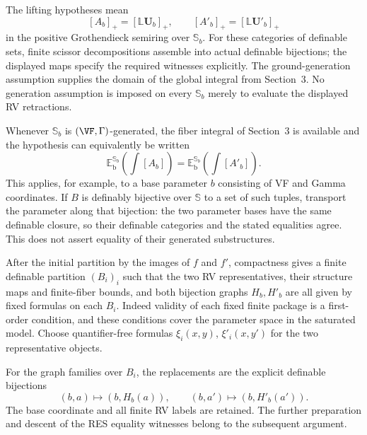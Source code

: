 The lifting hypotheses mean
\[
 [A_b]_+=[\mathbb L\bm U_b]_+,\qquad
 [A'_b]_+=[\mathbb L\bm U'_b]_+
\]
in the positive Grothendieck semiring over $\mathbb S_b$.
For these categories of definable sets, finite scissor
decompositions assemble into actual definable bijections;
the displayed maps specify the required witnesses explicitly.
The ground-generation assumption supplies the domain of
the global integral from Section~3.
No generation assumption is imposed on every $\mathbb S_b$
merely to evaluate the displayed RV retractions.



Whenever $\mathbb S_b$ is $(\VF,\Gamma)$-generated, the fiber
integral of Section~3 is available and the hypothesis can
equivalently be written
\[
 \mathbb E_{\mathrm b}^{\mathbb S_b}
       \!\left(\int[A_b]\right)
 =
 \mathbb E_{\mathrm b}^{\mathbb S_b}
       \!\left(\int[A'_b]\right).
\]
This applies, for example, to a base parameter $b$ consisting
of VF and Gamma coordinates.
If $B$ is definably bijective over $\mathbb S$ to a set of such
tuples, transport the parameter along that bijection:
the two parameter bases have the same definable closure,
so their definable categories and the stated equalities agree.
This does not assert equality of their generated substructures.

After the initial partition by the images of $f$ and $f'$,
compactness gives a finite definable partition $(B_i)_i$
such that the two RV representatives, their structure maps
and finite-fiber bounds, and both bijection graphs
$H_b,H'_b$ are all given by fixed formulas on each $B_i$.
Indeed validity of each fixed finite package is a first-order
condition, and these conditions cover the parameter space
in the saturated model. Choose quantifier-free formulas
$\xi_i(x,y)$, $\xi'_i(x,y')$ for the two representative objects.

For the graph families over $B_i$, the replacements are the
explicit definable bijections
\[
 (b,a)\longmapsto(b,H_b(a)),\qquad
 (b,a')\longmapsto(b,H'_b(a')).
\]
The base coordinate and all finite RV labels are retained.
The further preparation and descent of the RES equality
witnesses belong to the subsequent argument.
